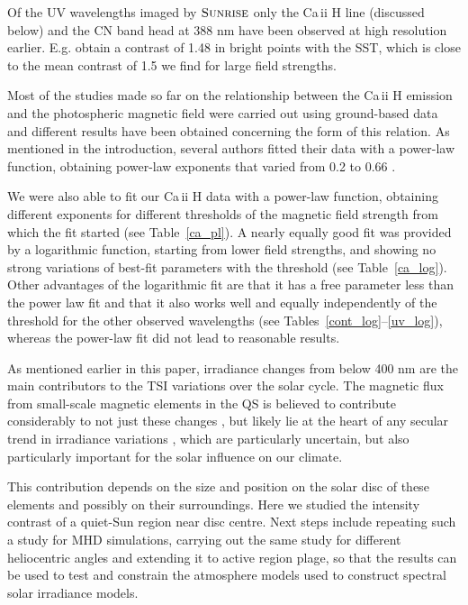 \documentclass[goettingen, gauss, print]{thesis}
\begin{document}
Of the UV wavelengths imaged by $\textsc{Sunrise}$ only the Ca\,{\sc ii} H line (discussed below) and the CN band head at 388 nm have been observed at high resolution earlier. E.g. \citet{zakharov_comparative_2005} obtain a contrast of 1.48 in bright points with the SST, which is close to the mean contrast of 1.5 we find for large field strengths.   

Most of the studies made so far on the relationship between the Ca\,{\sc ii} H emission and the photospheric magnetic field were carried out using ground-based data and different results have been obtained concerning the form of this relation. As mentioned in the introduction, several authors fitted their data with a power-law function, obtaining power-law exponents that varied from 0.2 \citep{rezaei_relation_2007} to 0.66 \citep{ortiz_how_2005}. 

We were also able to fit our Ca\,{\sc ii} H data with a power-law function, obtaining different exponents for different thresholds of the magnetic field strength from which the fit started (see Table~\ref{ca_pl}). A nearly equally good fit was provided by a logarithmic function, starting from lower field strengths, and showing no strong variations of best-fit parameters with the threshold (see Table~\ref{ca_log}).
Other advantages of the logarithmic fit are that it has a free parameter less than the power law fit and that it also works well and equally independently of the threshold for the other observed wavelengths (see Tables~\ref{cont_log}--\ref{uv_log}), whereas the power-law fit did not lead to reasonable results.

As mentioned earlier in this paper, irradiance changes from below 400 nm are the main contributors to the TSI variations over the solar cycle. The magnetic flux from small-scale magnetic elements in the QS is believed to contribute considerably to not just these changes \citep{krivova_reconstruction_2003}, but likely lie at the heart of any secular trend in irradiance variations \citep[e.g.,][]{krivova_reconstruction_2007, dasi-espuig_reconstruction_2016}, which are particularly uncertain, but also particularly important for the solar influence on our climate.

This contribution depends on the size and position on the solar disc of these elements and possibly on their surroundings. Here we studied the intensity contrast of a quiet-Sun region near disc centre. Next steps include repeating such a study for MHD simulations, carrying out the same study for different heliocentric angles and extending it to active region plage, so that the results can be used to test and constrain the atmosphere models used to construct spectral solar irradiance models.
\end{document}
